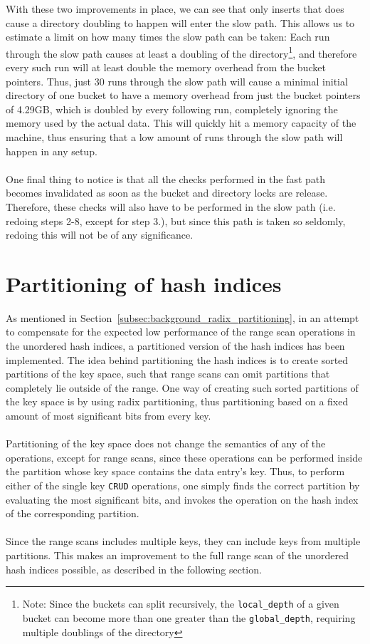 \documentclass[11pt]{report} %
\begin{document}
With these two improvements in place, we can see that only inserts that does cause a directory doubling to happen will enter the slow path. This allows us to estimate a limit on how many times the slow path can be taken: Each run through the slow path causes at least a doubling of the directory\footnote{Note: Since the buckets can split recursively, the \verb|local_depth| of a given bucket can become more than one greater than the \verb|global_depth|, requiring multiple doublings of the directory}, and therefore every such run will at least double the memory overhead from the bucket pointers. Thus, just 30 runs through the slow path will cause a minimal initial directory of one bucket to have a memory overhead from just the bucket pointers of 4.29GB, which is doubled by every following run, completely ignoring the memory used by the actual data. This will quickly hit a memory capacity of the machine, thus ensuring that a low amount of runs through the slow path will happen in any setup.\\
\\
One final thing to notice is that all the checks performed in the fast path becomes invalidated as soon as the bucket and directory locks are release. Therefore, these checks will also have to be performed in the slow path (i.e. redoing steps 2-8, except for step 3.), but since this path is taken so seldomly, redoing this will not be of any significance.
\section{Partitioning of hash indices}
\label{sec:design_partition_hash_index}
As mentioned in Section~\ref{subsec:background_radix_partitioning}, in an attempt to compensate for the expected low performance of the range scan operations in the unordered hash indices, a partitioned version of the hash indices has been implemented. The idea behind partitioning the hash indices is to create sorted partitions of the key space, such that range scans can omit partitions that completely lie outside of the range. One way of creating such sorted partitions of the key space is by using radix partitioning, thus partitioning based on a fixed amount of most significant bits from every key. \\
\\
Partitioning of the key space does not change the semantics of any of the operations, except for range scans, since these operations can be performed inside the partition whose key space contains the data entry's key. Thus, to perform either of the single key \verb|CRUD| operations, one simply finds the correct partition by evaluating the most significant bits, and invokes the operation on the hash index of the corresponding partition.\\
\\
Since the range scans includes multiple keys, they can include keys from multiple partitions. This makes an improvement to the full range scan of the unordered hash indices possible, as described in the following section.
\end{document}

